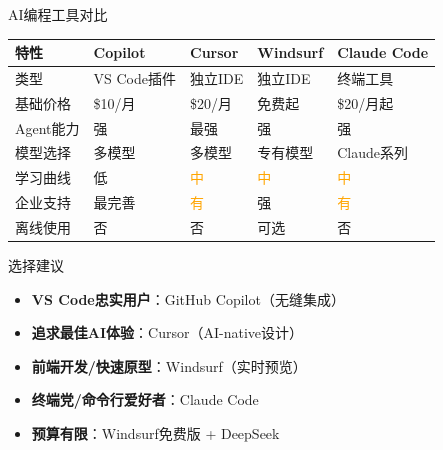 \documentclass[aspectratio=169,11pt]{beamer}
\begin{document}
\begin{frame}{AI编程工具对比}
    \footnotesize
    \begin{tabular}{p{2.2cm}p{2.5cm}p{2.5cm}p{2.5cm}p{2.5cm}}
        \toprule
        \textbf{特性} & \textbf{Copilot} & \textbf{Cursor} & \textbf{Windsurf} & \textbf{Claude Code} \\
        \midrule
        类型 & VS Code插件 & 独立IDE & 独立IDE & 终端工具 \\
        基础价格 & \$10/月 & \$20/月 & 免费起 & \$20/月起 \\
        Agent能力 & \textcolor{green!60!black}{强} & \textcolor{green!60!black}{最强} & \textcolor{green!60!black}{强} & \textcolor{green!60!black}{强} \\
        模型选择 & 多模型 & 多模型 & 专有模型 & Claude系列 \\
        学习曲线 & \textcolor{green!60!black}{低} & \textcolor{orange}{中} & \textcolor{orange}{中} & \textcolor{orange}{中} \\
        企业支持 & \textcolor{green!60!black}{最完善} & \textcolor{orange}{有} & \textcolor{green!60!black}{强} & \textcolor{orange}{有} \\
        离线使用 & 否 & 否 & 可选 & 否 \\
        \bottomrule
    \end{tabular}
    
    \vspace{0.5cm}
    \begin{block}{选择建议}
        \begin{itemize}
            \item \textbf{VS Code忠实用户}：GitHub Copilot（无缝集成）
            \item \textbf{追求最佳AI体验}：Cursor（AI-native设计）
            \item \textbf{前端开发/快速原型}：Windsurf（实时预览）
            \item \textbf{终端党/命令行爱好者}：Claude Code
            \item \textbf{预算有限}：Windsurf免费版 + DeepSeek
        \end{itemize}
    \end{block}
\end{frame}
\end{document}
